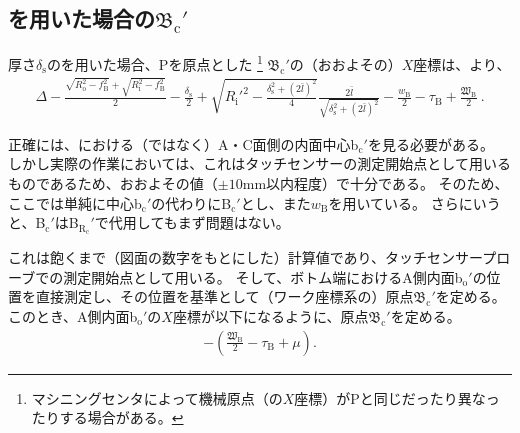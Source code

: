 \subsection[\Spacer を用いた場合の\texorpdfstring{$\mathfrak B_\mathrm c'$}{Bc'}]
           {\Spacer を用いた場合の$\boldsymbol{\mathfrak B_\mathrm c'}$}
厚さ$\delta_\mathrm s$の\Spacer を用いた場合、\TableCenter Pを原点とした
\footnote{マシニングセンタによって機械原点（の$X$座標）が\TableCenter Pと同じだったり異なったりする場合がある。}\relax
\BottomOutcutCenter$\mathfrak B_\mathrm c'$の（おおよその）$X$座標は、より、
\begin{align*}
  \Delta-\frac{\sqrt{R_\mathrm o^2-f_\mathrm B^2}+\sqrt{R_\mathrm i^2-f_\mathrm B^2}}2-\frac{\delta_\mathrm s}2
  +\sqrt{R_\mathrm i'^2-\frac{\delta_\mathrm s^2+(2\bar l)^2}4}\frac{2\bar l}{\sqrt{\delta_\mathrm s^2+(2\bar l)^2}}
  -\frac{w_\mathrm B}2-\tau_\mathrm B+\frac{\mathfrak W_\mathrm B}2\ .
\end{align*}
\begin{hosoku}
正確には、\nameBottomEndFace における（\InnerDiameter ではなく）A・C面側の内面中心b$_\mathrm c'$を見る必要がある。
しかし実際の作業においては、これはタッチセンサーの測定開始点として用いるものであるため、おおよその値（$\pm10$mm以内程度）で十分である。
そのため、ここでは単純に中心b$_\mathrm c'$の代わりに\BottomODCenter B$_\mathrm c'$とし、また\BottomEndACID$w_\mathrm B$を用いている。
さらにいうと、\BottomODCenter B$_\mathrm c'$は\BottomCurvatureCenter B$_{\mathrm R_\mathrm c}'$で代用してもまず問題はない。
\end{hosoku}
これは飽くまで（図面の数字をもとにした）計算値であり、タッチセンサープローブでの測定開始点として用いる。
そして、ボトム端におけるA側内面b$_\mathrm o'$の位置を直接測定し、その位置を基準として（ワーク座標系の）原点$\mathfrak B_\mathrm c'$を定める。
このとき、A側内面b$_\mathrm o'$の$X$座標が以下になるように、原点$\mathfrak B_\mathrm c'$を定める。
\begin{align*}
  -\left(\frac{\mathfrak W_\mathrm B}2-\tau_\mathrm B+\mu\right).
\end{align*}

